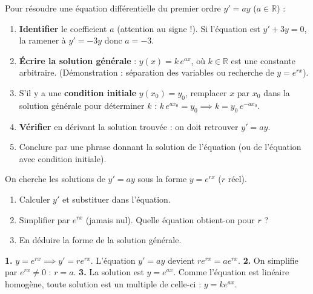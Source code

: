 \documentclass[11pt]{article}
\begin{document}
\begin{methode}[Résolution de $y' = ay$ (avec ou sans condition initiale)]
Pour résoudre une équation différentielle du premier ordre $y' = ay$ ($a \in \mathbb{R}$) :
\begin{enumerate}
\item \textbf{Identifier} le coefficient $a$ (attention au signe !). Si l'équation est $y' + 3y = 0$, la ramener à $y' = -3y$ donc $a = -3$.
\item \textbf{Écrire la solution générale} : $y(x) = k\,e^{ax}$, où $k \in \mathbb{R}$ est une constante arbitraire. (Démonstration : séparation des variables ou recherche de $y = e^{rx}$).
\item S'il y a une \textbf{condition initiale} $y(x_0) = y_0$, remplacer $x$ par $x_0$ dans la solution générale pour déterminer $k$ : $k\,e^{a x_0} = y_0 \implies k = y_0\,e^{-a x_0}$.
\item \textbf{Vérifier} en dérivant la solution trouvée : on doit retrouver $y' = ay$.
\item Conclure par une phrase donnant la solution de l'équation (ou de l'équation avec condition initiale).
\end{enumerate}
\end{methode}

\begin{experience}
On cherche les solutions de $y' = ay$ sous la forme $y = e^{rx}$ ($r$ réel).
\begin{enumerate}
\item Calculer $y'$ et substituer dans l'équation.
\item Simplifier par $e^{rx}$ (jamais nul). Quelle équation obtient-on pour $r$ ?
\item En déduire la forme de la solution générale.
\end{enumerate}
\tcblower
\textbf{1.} $y = e^{rx} \implies y' = r e^{rx}$. L'équation $y' = ay$ devient $r e^{rx} = a e^{rx}$.
\textbf{2.} On simplifie par $e^{rx} \neq 0$ : $r = a$.
\textbf{3.} La solution est $y = e^{ax}$. Comme l'équation est linéaire homogène, toute solution est un multiple de celle-ci : $y = k e^{ax}$.
\end{experience}
\end{document}
